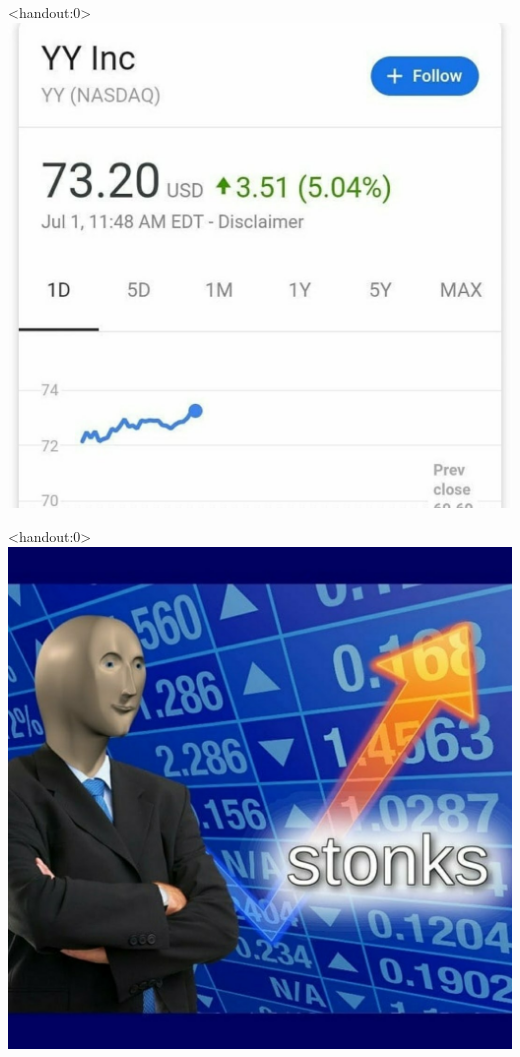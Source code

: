 \documentclass[english,10pt
,aspectratio=169
]{beamer}
\begin{document}
\begin{frame}<handout:0>
	\centering \includegraphics[width=0.55\paperwidth]{pics/yy3}
\end{frame}


\begin{frame}<handout:0>
	\centering \includegraphics[width=0.55\paperwidth]{pics/yy4}
\end{frame}
\end{document}

